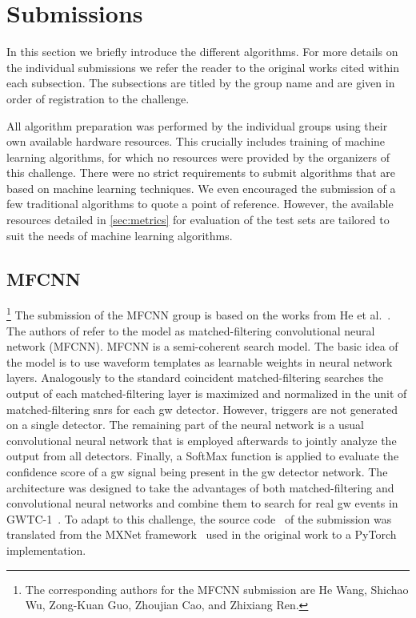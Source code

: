 \section{Submissions}\label{sec:submissions}
In this section we briefly introduce the different algorithms. For more details on the individual submissions we refer the reader to the original works cited within each subsection. The subsections are titled by the group name and are given in order of registration to the challenge.

All algorithm preparation was performed by the individual groups using their own available hardware resources. This crucially includes training of machine learning algorithms, for which no resources were provided by the organizers of this challenge. There were no strict requirements to submit algorithms that are based on machine learning techniques. We even encouraged the submission of a few traditional algorithms to quote a point of reference. However, the available resources detailed in \autoref{sec:metrics} for evaluation of the test sets are tailored to suit the needs of machine learning algorithms.


\subsection{MFCNN}\label{sec:submission-mfcnn}
\footnote{The corresponding authors for the MFCNN submission are He Wang, Shichao Wu, Zong-Kuan Guo, Zhoujian Cao, and Zhixiang Ren.}
The submission of the MFCNN group is based on the works from He et al.~\cite{Wang:2019zaj}. The authors of \cite{Wang:2019zaj} refer to the model as matched-filtering convolutional neural network (MFCNN). MFCNN is a semi-coherent search model. The basic idea of the model is to use waveform templates as learnable weights in neural network layers. Analogously to the standard coincident matched-filtering searches the output of each matched-filtering layer is maximized and normalized in the unit of matched-filtering \acrshort{snr}s for each \acrshort{gw} detector. However, triggers are not generated on a single detector. The remaining part of the neural network is a usual convolutional neural network that is employed afterwards to jointly analyze the output from all detectors. Finally, a SoftMax function is applied to evaluate the confidence score of a \acrshort{gw} signal being present in the \acrshort{gw} detector network. The architecture was designed to take the advantages of both matched-filtering and convolutional neural networks and combine them to search for real \acrshort{gw} events in GWTC-1~\cite{LIGOScientific:2018mvr}. To adapt to this challenge, the source code~\cite{Wang:2022aaa} of the submission was translated from the MXNet framework~\cite{Chen:2015aaa} used in the original work to a PyTorch~\cite{Paszke:2019aaa} implementation.

